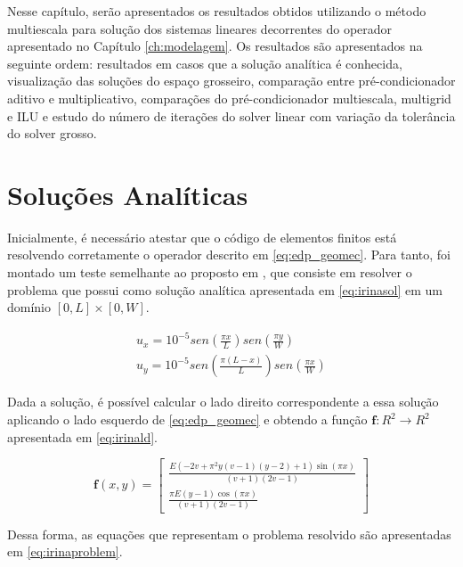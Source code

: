 Nesse capítulo, serão apresentados os resultados obtidos utilizando o método multiescala para solução dos sistemas lineares decorrentes do operador apresentado no Capítulo \ref{ch:modelagem}. Os resultados são apresentados na seguinte ordem: resultados em casos que a solução analítica é conhecida, visualização das soluções do espaço grosseiro, comparação entre pré-condicionador aditivo e multiplicativo, comparações do pré-condicionador multiescala, multigrid e ILU e estudo do número de iterações do solver linear com variação da tolerância do solver grosso.

\section{Soluções Analíticas}

Inicialmente, é necessário atestar que o código de elementos finitos está resolvendo corretamente o operador descrito em \eqref{eq:edp_geomec}. Para tanto, foi montado um teste semelhante ao proposto em \cite{irina}, que consiste em resolver o problema que possui como solução analítica apresentada em \eqref{eq:irinasol} em um domínio  $[0,L] \times [0, W]$.


\begin{equation} \label{eq:irinasol}
  \begin{aligned}
  u_x = 10^{-5} sen(\frac{\pi x}{L}) sen(\frac{\pi y}{W})  \\
  u_y = 10^{-5} sen(\frac{\pi (L-x)}{L}) sen(\frac{\pi x}{W})
  \end{aligned}
\end{equation}

Dada a solução, é possível calcular o lado direito correspondente a essa solução aplicando o lado esquerdo de \eqref{eq:edp_geomec} e obtendo a função $\mathbf{f}: R^2 \rightarrow R^2$ apresentada em \eqref{eq:irinald}. 

\begin{equation} \label{eq:irinald}
\mathbf{f}(x, y) = 
\left[\begin{matrix}\frac{E \left(- 2 v + \pi^{2} y \left(v - 1\right) \left(y - 2\right) + 1\right) \sin{\left (\pi x \right )}}{\left(v + 1\right) \left(2 v - 1\right)} \\ \frac{\pi E \left(y - 1\right) \cos{\left (\pi x \right )}}{\left(v + 1\right) \left(2 v - 1\right)}\end{matrix}\right]
\end{equation}

Dessa forma, as equações que representam o problema resolvido são apresentadas em \eqref{eq:irinaproblem}. 

